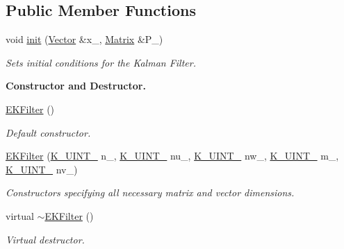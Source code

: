 \subsection*{Public Member Functions}
\begin{DoxyCompactItemize}
\item 
void \mbox{\hyperlink{classKalman_1_1EKFilter_a80d5dc8f46e8f5d4ec3a6b1e804fdc9f}{init}} (\mbox{\hyperlink{classKalman_1_1EKFilter_af773d1217ecb01925b857d49b32bc636}{Vector}} \&x\+\_\+, \mbox{\hyperlink{classKalman_1_1EKFilter_a7cbc4cb4d9139a7f241b27110426af43}{Matrix}} \&P\+\_\+)
\begin{DoxyCompactList}\small\item\em Sets initial conditions for the Kalman Filter. \end{DoxyCompactList}\end{DoxyCompactItemize}
\begin{Indent}\textbf{ Constructor and Destructor.}\par
\begin{DoxyCompactItemize}
\item 
\mbox{\label{classKalman_1_1EKFilter_a448c107f8f22cc8b041d34d785dd2a58}} 
\mbox{\hyperlink{classKalman_1_1EKFilter_a448c107f8f22cc8b041d34d785dd2a58}{E\+K\+Filter}} ()
\begin{DoxyCompactList}\small\item\em Default constructor. \end{DoxyCompactList}\item 
\mbox{\hyperlink{classKalman_1_1EKFilter_aaf0ddc0f02fe2064481400de28a27fde}{E\+K\+Filter}} (\mbox{\hyperlink{namespaceKalman_a628a50cae10f6e2035393d4f96c698bd}{K\+\_\+\+U\+I\+N\+T\+\_}} n\+\_\+, \mbox{\hyperlink{namespaceKalman_a628a50cae10f6e2035393d4f96c698bd}{K\+\_\+\+U\+I\+N\+T\+\_}} nu\+\_\+, \mbox{\hyperlink{namespaceKalman_a628a50cae10f6e2035393d4f96c698bd}{K\+\_\+\+U\+I\+N\+T\+\_}} nw\+\_\+, \mbox{\hyperlink{namespaceKalman_a628a50cae10f6e2035393d4f96c698bd}{K\+\_\+\+U\+I\+N\+T\+\_}} m\+\_\+, \mbox{\hyperlink{namespaceKalman_a628a50cae10f6e2035393d4f96c698bd}{K\+\_\+\+U\+I\+N\+T\+\_}} nv\+\_\+)
\begin{DoxyCompactList}\small\item\em Constructors specifying all necessary matrix and vector dimensions. \end{DoxyCompactList}\item 
\mbox{\label{classKalman_1_1EKFilter_aeabe4165de52b77d480a6cbe5f2ac572}} 
virtual \mbox{\hyperlink{classKalman_1_1EKFilter_aeabe4165de52b77d480a6cbe5f2ac572}{$\sim$\+E\+K\+Filter}} ()
\begin{DoxyCompactList}\small\item\em Virtual destructor. \end{DoxyCompactList}\end{DoxyCompactItemize}
\end{Indent}
